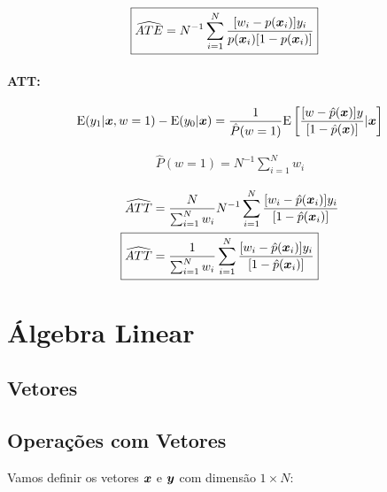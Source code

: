 \documentclass[11pt, oneside, a4paper, article]{article}
\numberwithin{equation}{section}
\begin{document}
\begin{description}
\begin{align*}
	\Aboxed{
		\widehat{ATE} =
		N^{-1} \sum_{i=1}^{N}
		\frac{[ w_{i} - p(\xvec_{i} ) ] y_{i} }{ p( \xvec_{i} ) [1 - p( \xvec_{i} ) ] }
	}
\end{align*}

\paragraph{ATT:}

\begin{align*}
	\text{E}( y_{1} | \boldsymbol{x}, w=1) - \text{E}(y_{0} | \boldsymbol{x}) =
	\frac{1}{\hat{P}(w=1)}
	\text{E}\left[ 
		\frac{[w - \hat{p}(\boldsymbol{x})] y}{[ 1 - \hat{p}(\boldsymbol{x}) ]}
		| \boldsymbol{x}
	\right]
\end{align*}

\vspace{-1 em}
\begin{align*}
	\hat{P} (w = 1) = N^{-1} \sum_{i=1}^{N} w_{i}
\end{align*}

\vspace{-1.5 em}
\begin{align*}
	\widehat{ATT} &=
	\frac{N}{\sum_{i=1}^{N} w_{i} }
	N^{-1} \sum_{i=1}^{N}
	\frac{[ w_{i} - \hat{p}(\xvec_{i} ) ] y_{i} }{[ 1 - \hat{p}( \xvec_{i} ) ]}
	\\
	\Aboxed{
		\widehat{ATT} &=
		\frac{1}{\sum_{i=1}^{N} w_{i} }
		\sum_{i=1}^{N}
		\frac{[ w_{i} - \hat{p}(\xvec_{i} ) ] y_{i} }{[1 - \hat{p}( \xvec_{i} ) ]}
	}
\end{align*}

\clearpage
\section{Álgebra Linear}

\subsection{Vetores}


\subsection{Operações com Vetores}

Vamos definir os vetores $\boldsymbol{x}$ e $\boldsymbol{y}$ com dimensão $1 \times N$:


\end{description}
\end{document}
